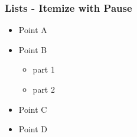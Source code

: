  
\label{pause}
\begin{frame}\frametitle{Lists - Itemize with Pause}
  \begin{itemize}
    \pause \item Point A
    \pause \item Point B
    \begin{itemize}
      \pause \item part 1
      \pause \item part 2
    \end{itemize}
    \pause \item Point C
    \pause \item Point D
  \end{itemize}
\end{frame}

 
